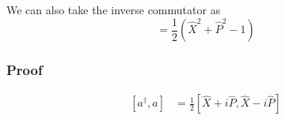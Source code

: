 \documentclass{article}
\newcommand{\be}{\begin{equation}}
\newcommand{\ee}{\end{equation}}
\newcommand{\dg}{\dagger}
\begin{document}
We can also take the inverse commutator as
\be
[a^\dg, a] = \frac{1}{2}\left(\hat{X}^2 + \hat{P}^2 - 1\right)
\ee
\subsubsection*{Proof}
\be
\begin{split}
    [a^\dg,a] &= \frac{1}{2} \left[\hat{X} + i\hat{P}, \hat{X} - i\hat{P}\right]\\
\end{split}
\ee
\end{document}
